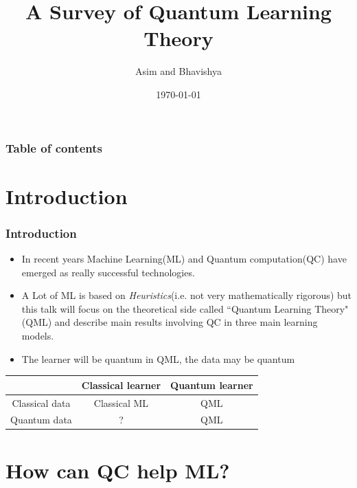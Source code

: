 \documentclass{beamer}
\begin{document}
\title{A Survey of Quantum Learning Theory}
\author{Asim and Bhavishya}
\date{\today} 

\begin{frame}
\titlepage
\end{frame}

\begin{frame}\frametitle{Table of contents}\tableofcontents
\end{frame} 


\section{Introduction} 
\begin{frame}\frametitle{Introduction} 
\begin{itemize}
    \item  In recent years Machine Learning(ML) and Quantum computation(QC) have emerged as really successful technologies.  \pause
    \item  A Lot of ML is based on \textit{Heuristics}(i.e. not very mathematically rigorous) but this talk will focus on the theoretical side
    called ``Quantum Learning Theory"(QML) and describe main results involving QC in three main learning models. \pause
    \item  The learner will be quantum in QML, the data may be quantum
    \end{itemize}
    \begin{center}
\begin{tabular}{ |c|c|c| } 
 \hline
  &  Classical learner &  Quantum learner\\ 
  \hline
  Classical data & Classical ML & QML \\ 
  \hline
  Quantum data & ? &  QML \\ 
 \hline
\end{tabular}
\end{center}
 \end{frame}



\section{How can QC help ML?} 
\end{document}
